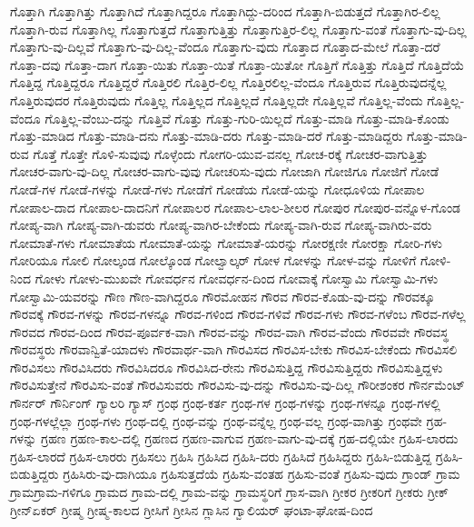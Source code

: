{ಗೊತ್ತಾಗಿ
ಗೊತ್ತಾಗಿತ್ತು
ಗೊತ್ತಾಗಿದೆ
ಗೊತ್ತಾಗಿದ್ದರೂ
ಗೊತ್ತಾಗಿದ್ದು-ದರಿಂದ
ಗೊತ್ತಾಗಿ-ಬಿಡುತ್ತದೆ
ಗೊತ್ತಾಗಿರ-ಲಿಲ್ಲ
ಗೊತ್ತಾಗಿ-ರುವ
ಗೊತ್ತಾಗಿಲ್ಲ
ಗೊತ್ತಾಗುತ್ತದೆ
ಗೊತ್ತಾಗುತ್ತಿತ್ತು
ಗೊತ್ತಾಗುತ್ತಿರ-ಲಿಲ್ಲ
ಗೊತ್ತಾಗು-ವಂತೆ
ಗೊತ್ತಾಗು-ವು-ದಿಲ್ಲ
ಗೊತ್ತಾಗು-ವು-ದಿಲ್ಲವೆ
ಗೊತ್ತಾಗು-ವು-ದಿಲ್ಲ-ವೆಂದೂ
ಗೊತ್ತಾಗು-ವುದು
ಗೊತ್ತಾದ
ಗೊತ್ತಾದ-ಮೇಲೆ
ಗೊತ್ತಾ-ದರೆ
ಗೊತ್ತಾ-ದವು
ಗೊತ್ತಾ-ದಾಗ
ಗೊತ್ತಾ-ಯಿತು
ಗೊತ್ತಾ-ಯಿತೆ
ಗೊತ್ತಾ-ಯಿತೋ
ಗೊತ್ತಿಗೆ
ಗೊತ್ತಿತ್ತು
ಗೊತ್ತಿದೆ
ಗೊತ್ತಿದೆಯೆ
ಗೊತ್ತಿದ್ದ
ಗೊತ್ತಿದ್ದರೂ
ಗೊತ್ತಿದ್ದರೆ
ಗೊತ್ತಿರಲಿ
ಗೊತ್ತಿರ-ಲಿಲ್ಲ
ಗೊತ್ತಿರಲಿಲ್ಲ-ವೆಂದೂ
ಗೊತ್ತಿರುವ
ಗೊತ್ತಿರುವುದನ್ನೆಲ್ಲ
ಗೊತ್ತಿರುವುದರ
ಗೊತ್ತಿರುವುದು
ಗೊತ್ತಿಲ್ಲ
ಗೊತ್ತಿಲ್ಲದ
ಗೊತ್ತಿಲ್ಲದೆ
ಗೊತ್ತಿಲ್ಲದೇ
ಗೊತ್ತಿಲ್ಲವೆ
ಗೊತ್ತಿಲ್ಲ-ವೆಂದು
ಗೊತ್ತಿಲ್ಲ-ವೆಂದೂ
ಗೊತ್ತಿಲ್ಲ-ವೆಂಬು-ದನ್ನು
ಗೊತ್ತಿವೆ
ಗೊತ್ತು
ಗೊತ್ತು-ಗುರಿ-ಯಿಲ್ಲದೆ
ಗೊತ್ತು-ಮಾಡಿ
ಗೊತ್ತು-ಮಾಡಿ-ಕೊಂಡು
ಗೊತ್ತು-ಮಾಡಿದ
ಗೊತ್ತು-ಮಾಡಿ-ದನು
ಗೊತ್ತು-ಮಾಡಿ-ದರು
ಗೊತ್ತು-ಮಾಡಿ-ದರೆ
ಗೊತ್ತು-ಮಾಡಿದ್ದರು
ಗೊತ್ತು-ಮಾಡಿ-ರುವ
ಗೊತ್ತೆ
ಗೊತ್ತೇ
ಗೊಳಿ-ಸುವುವು
ಗೊಳ್ಳೆಂದು
ಗೋಗರಿ-ಯುವ-ವನಲ್ಲ
ಗೋಚ-ರಕ್ಕೆ
ಗೋಚರ-ವಾಗುತ್ತಿತ್ತು
ಗೋಚರ-ವಾಗು-ವು-ದಿಲ್ಲ
ಗೋಚರ-ವಾಗು-ವುವು
ಗೋಚರಿಸು-ವುದು
ಗೋಜಾಗಿ
ಗೋಜಿಗೂ
ಗೋಜಿಗೆ
ಗೋಡೆ
ಗೋಡೆ-ಗಳ
ಗೋಡೆ-ಗಳನ್ನು
ಗೋಡೆ-ಗಳು
ಗೋಡೆಗೆ
ಗೋಡೆಯ
ಗೋಡೆ-ಯನ್ನು
ಗೋಧೂಳಿಯ
ಗೋಪಾಲ
ಗೋಪಾಲ-ದಾದ
ಗೋಪಾಲ-ದಾದನಿಗೆ
ಗೋಪಾಲರ
ಗೋಪಾಲ-ಲಾಲ-ಶೀಲರ
ಗೋಪುರ
ಗೋಪುರ-ವನ್ನೊಳ-ಗೊಂಡ
ಗೋಪ್ಯ-ವಾಗಿ
ಗೋಪ್ಯ-ವಾಗಿ-ಡುವರು
ಗೋಪ್ಯ-ವಾಗಿರ-ಬೇಕೆಂದು
ಗೋಪ್ಯ-ವಾಗಿ-ರುವ
ಗೋಪ್ಯ-ವಾಗಿರು-ವರು
ಗೋಮಾತೆ-ಗಳು
ಗೋಮಾತೆಯ
ಗೋಮಾತೆ-ಯನ್ನು
ಗೋಮಾತೆ-ಯರನ್ನು
ಗೋರಕ್ಷಣೀ
ಗೋರಕ್ಷಾ
ಗೋರಿ-ಗಳು
ಗೋರಿಯೂ
ಗೋಲಿ
ಗೋಲ್ಕಂಡ
ಗೋಲ್ಕೊಂಡ
ಗೋಲ್ವಾಲ್ಕರ್
ಗೋಳ
ಗೋಳನ್ನು
ಗೋಳ-ವನ್ನು
ಗೋಳಿಗೆ
ಗೋಳಿ-ನಿಂದ
ಗೋಳು
ಗೋಳು-ಮುಖವೇ
ಗೋವರ್ಧನ
ಗೋವರ್ಧನ-ದಿಂದ
ಗೋವಾಕ್ಕೆ
ಗೋಸ್ವಾಮಿ
ಗೋಸ್ವಾಮಿ-ಗಳು
ಗೋಸ್ವಾಮಿ-ಯವರನ್ನು
ಗೌಣ
ಗೌಣ-ವಾಗಿದ್ದರೂ
ಗೌರಮೋಹನ
ಗೌರವ
ಗೌರವ-ಕೊಡು-ವು-ದನ್ನು
ಗೌರವಕ್ಕೂ
ಗೌರವಕ್ಕೆ
ಗೌರವ-ಗಳನ್ನು
ಗೌರವ-ಗಳನ್ನೂ
ಗೌರವ-ಗಳಿಂದ
ಗೌರವ-ಗಳಿವೆ
ಗೌರವ-ಗಳು
ಗೌರವ-ಗಳೆಂಬ
ಗೌರವ-ಗಳೆಲ್ಲ
ಗೌರವದ
ಗೌರವ-ದಿಂದ
ಗೌರವ-ಪೂರ್ವಕ-ವಾಗಿ
ಗೌರವ-ವನ್ನು
ಗೌರವ-ವಾಗಿ
ಗೌರವ-ವೆಂದು
ಗೌರವವೇ
ಗೌರವಸ್ಥ
ಗೌರವಸ್ಥರು
ಗೌರವಾನ್ವಿತೆ-ಯಾದಳು
ಗೌರವಾರ್ಥ-ವಾಗಿ
ಗೌರವಿಸದ
ಗೌರವಿಸ-ಬೇಕು
ಗೌರವಿಸ-ಬೇಕೆಂದು
ಗೌರವಿಸಲಿ
ಗೌರವಿಸಲು
ಗೌರವಿಸಿದರು
ಗೌರವಿಸಿದರೂ
ಗೌರವಿಸಿದ-ರೇನು
ಗೌರವಿಸುತ್ತಿದ್ದ
ಗೌರವಿಸುತ್ತಿದ್ದರು
ಗೌರವಿಸುತ್ತಿದ್ದಳು
ಗೌರವಿಸುತ್ತೇನೆ
ಗೌರವಿಸು-ವಂತೆ
ಗೌರವಿಸುವರು
ಗೌರವಿಸು-ವು-ದನ್ನು
ಗೌರವಿಸು-ವು-ದಿಲ್ಲ
ಗೌರೀಶಂಕರ
ಗೌರ್ನಮೆಂಟ್
ಗೌರ್ನರ್
ಗೌರ್ನಿಂಗ್
ಗ್ಯಾಲರಿ
ಗ್ಯಾಸ್
ಗ್ರಂಥ
ಗ್ರಂಥ-ಕರ್ತ
ಗ್ರಂಥ-ಗಳ
ಗ್ರಂಥ-ಗಳನ್ನು
ಗ್ರಂಥ-ಗಳನ್ನೂ
ಗ್ರಂಥ-ಗಳಲ್ಲಿ
ಗ್ರಂಥ-ಗಳಲ್ಲೆಲ್ಲಾ
ಗ್ರಂಥ-ಗಳು
ಗ್ರಂಥ-ದಲ್ಲಿ
ಗ್ರಂಥ-ವನ್ನು
ಗ್ರಂಥ-ವನ್ನೆಲ್ಲ
ಗ್ರಂಥ-ವಲ್ಲ
ಗ್ರಂಥ-ವಾಗಿತ್ತು
ಗ್ರಂಥವೇ
ಗ್ರಹ-ಗಳನ್ನು
ಗ್ರಹಣ
ಗ್ರಹಣ-ಕಾಲ-ದಲ್ಲಿ
ಗ್ರಹಣದ
ಗ್ರಹಣ-ವಾಗುವ
ಗ್ರಹಣ-ವಾಗು-ವು-ದಕ್ಕೆ
ಗ್ರಹ-ದಲ್ಲಿಯೇ
ಗ್ರಹಿಸ-ಲಾರದು
ಗ್ರಹಿಸ-ಲಾರದೆ
ಗ್ರಹಿಸ-ಲಾರರು
ಗ್ರಹಿಸಲು
ಗ್ರಹಿಸಿ
ಗ್ರಹಿಸಿದ
ಗ್ರಹಿಸಿ-ದರು
ಗ್ರಹಿಸಿದೆ
ಗ್ರಹಿಸಿದ್ದರು
ಗ್ರಹಿಸಿ-ಬಿಡುತ್ತಿದ್ದ
ಗ್ರಹಿಸಿ-ಬಿಡುತ್ತಿದ್ದರು
ಗ್ರಹಿಸಿರು-ವು-ದಾಗಿಯೂ
ಗ್ರಹಿಸುತ್ತದೆಯೆ
ಗ್ರಹಿಸು-ವಂತಹ
ಗ್ರಹಿಸು-ವಂತೆ
ಗ್ರಹಿಸು-ವುದು
ಗ್ರಾಂಡ್
ಗ್ರಾಮ
ಗ್ರಾಮಗ್ರಾಮ-ಗಳಿಗೂ
ಗ್ರಾಮದ
ಗ್ರಾಮ-ದಲ್ಲಿ
ಗ್ರಾಮ-ವನ್ನು
ಗ್ರಾಮಸ್ಥರಿಗೆ
ಗ್ರಾಸ-ವಾಗಿ
ಗ್ರೀಕರ
ಗ್ರೀಕರಿಗೆ
ಗ್ರೀಕರು
ಗ್ರೀಕ್
ಗ್ರೀನ್ಏಕರ್
ಗ್ರೀಷ್ಮ
ಗ್ರೀಷ್ಮ-ಕಾಲದ
ಗ್ರೀಸಿಗೆ
ಗ್ರೀಸಿನ
ಗ್ಲಾಸಿನ
ಗ್ವಾಲಿಯರ್
ಘಂಟಾ-ಘೋಷ-ದಿಂದ
}

